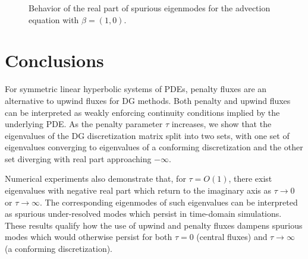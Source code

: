 \documentclass[preprint,10pt]{elsarticle}
\begin{document}
\begin{figure}
\centering
{}
\hspace{.5em}
\hspace{.5em}
\caption{Behavior of the real part of spurious eigenmodes for the advection equation with $\beta = (1,0)$. }
\label{fig:trackModesAdvecU}
\end{figure}

\section{Conclusions}

For symmetric linear hyperbolic systems of PDEs, penalty fluxes are an alternative to upwind fluxes for DG methods.  Both penalty and upwind fluxes can be interpreted as weakly enforcing continuity conditions implied by the underlying PDE.  As the penalty parameter $\tau$ increases, we show that the eigenvalues of the DG discretization matrix split into two sets, with one set of eigenvalues converging to eigenvalues of a conforming discretization and the other set diverging with real part approaching $-\infty$.  

Numerical experiments also demonstrate that, for $\tau = O(1)$, there exist eigenvalues with negative real part which return to the imaginary axis as $\tau \rightarrow 0$ or $\tau\rightarrow \infty$.  The corresponding eigenmodes of such eigenvalues can be interpreted as spurious under-resolved modes which persist in time-domain simulations.  These results qualify how the use of upwind and penalty fluxes dampens spurious modes which would otherwise persist for both $\tau = 0$ (central fluxes) and $\tau \rightarrow\infty$ (a conforming discretization).  



\end{document}
